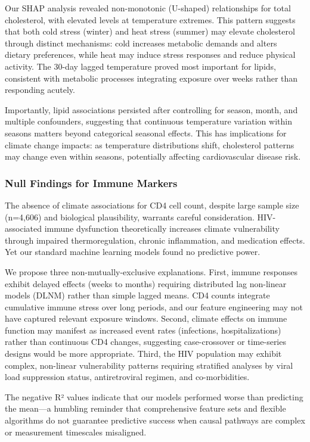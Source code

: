 Our SHAP analysis revealed non-monotonic (U-shaped) relationships for total cholesterol, with elevated levels at temperature extremes. This pattern suggests that both cold stress (winter) and heat stress (summer) may elevate cholesterol through distinct mechanisms: cold increases metabolic demands and alters dietary preferences, while heat may induce stress responses and reduce physical activity. The 30-day lagged temperature proved most important for lipids, consistent with metabolic processes integrating exposure over weeks rather than responding acutely.

Importantly, lipid associations persisted after controlling for season, month, and multiple confounders, suggesting that continuous temperature variation within seasons matters beyond categorical seasonal effects. This has implications for climate change impacts: as temperature distributions shift, cholesterol patterns may change even within seasons, potentially affecting cardiovascular disease risk.

\subsubsection{Null Findings for Immune Markers}

The absence of climate associations for CD4 cell count, despite large sample size (n=4,606) and biological plausibility, warrants careful consideration. HIV-associated immune dysfunction theoretically increases climate vulnerability through impaired thermoregulation, chronic inflammation, and medication effects. Yet our standard machine learning models found no predictive power.

We propose three non-mutually-exclusive explanations. First, immune responses exhibit delayed effects (weeks to months) requiring distributed lag non-linear models (DLNM) rather than simple lagged means. CD4 counts integrate cumulative immune stress over long periods, and our feature engineering may not have captured relevant exposure windows. Second, climate effects on immune function may manifest as increased event rates (infections, hospitalizations) rather than continuous CD4 changes, suggesting case-crossover or time-series designs would be more appropriate. Third, the HIV population may exhibit complex, non-linear vulnerability patterns requiring stratified analyses by viral load suppression status, antiretroviral regimen, and co-morbidities.

The negative R² values indicate that our models performed worse than predicting the mean---a humbling reminder that comprehensive feature sets and flexible algorithms do not guarantee predictive success when causal pathways are complex or measurement timescales misaligned.

